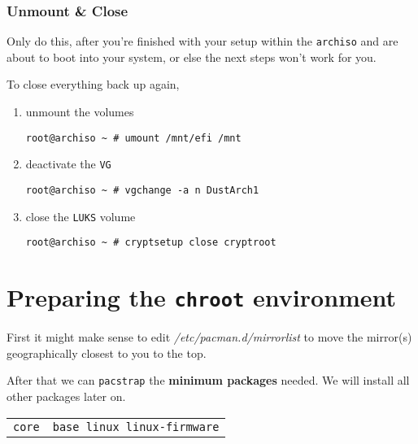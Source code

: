 \documentclass[9pt]{report}
\newenvironment{WARNING}
{\begin{tcolorbox}[colback=admonitionBG,coltitle=draculaBG,colframe=draculaOrange,colbacktitle=draculaOrange,title=WARNING]}
{\end{tcolorbox}}
\newenvironment{packagetable}
{\begin{longtabu}to \textwidth [b]{X[1,r]|X[1,l]}}
{\end{longtabu}}
\begin{document}
\newpage

\hypertarget{x-unmount-and-close}{\subsubsection{Unmount \& Close}}
\begin{WARNING}
    Only do this, after you’re finished with your setup within the \texttt{archiso} and are about to boot into your system, or else the next steps won’t work for you.

\end{WARNING}
To close everything back up again,


\begin{enumerate}

    \item{unmount the volumes}

        \begin{verbatim}
root@archiso ~ # umount /mnt/efi /mnt
        \end{verbatim}
    \item{deactivate the \texttt{VG}}

        \begin{verbatim}
root@archiso ~ # vgchange -a n DustArch1
        \end{verbatim}
    \item{close the \texttt{LUKS} volume}

        \begin{verbatim}
root@archiso ~ # cryptsetup close cryptroot
        \end{verbatim}
\end{enumerate}



\newpage

\hypertarget{x-preparing-the-chroot-environment}{\section{Preparing the \texttt{chroot} environment}}
First it might make sense to edit \textit{/etc/pacman.d/mirrorlist} to move the mirror(s) geographically closest to you to the top.


After that we can \texttt{pacstrap} the \textbf{minimum packages} needed.
We will install all other packages later on.


\begin{packagetable}
    \texttt{core} & \texttt{base linux linux-firmware} \\ 
\end{packagetable}
\end{document}
